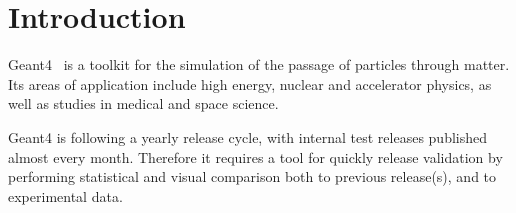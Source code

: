 \section{Introduction}
\label{sec-introduction}
Geant4~\cite{Geant4} is a toolkit for the simulation of the passage of particles through matter. Its areas of application include high energy, nuclear and accelerator physics, as well as studies in medical and space science. 

Geant4 is following a yearly release cycle, with internal test releases published almost every month. Therefore it requires a tool for quickly release validation by performing statistical and visual comparison both to previous release(s), and to experimental data. 
%

